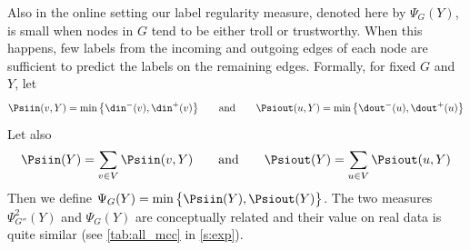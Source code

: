 Also in the online setting our label regularity measure, denoted here by $\Psi_G(Y)$, is small when
nodes in $G$ tend to be either troll or trustworthy. When this happens, few labels from the
incoming and outgoing edges of each node are sufficient to predict the labels on the remaining
edges. Formally, for fixed $G$ and $Y$, let 
$$
\Psiin(v,Y) = \min\big\{\din^-(v),\din^+(v)\big\}
\qquad\text{and}\qquad
\Psiout(u,Y) = \min\big\{\dout^-(u),\dout^+(u)\big\}
$$
Let also
$$
\Psiin(Y) = \sum_{v \in V} \Psiin(v,Y)
\qquad\text{and}\qquad
\Psiout(Y) = \sum_{u \in V} \Psiout(u,Y)
$$
Then we define $\Psi_G(Y) = \min\big\{\Psiin(Y),\Psiout(Y)\big\}$. The two measures
$\Psi^2_{G''}(Y)$ and $\Psi_G(Y)$ are conceptually related and their value on real data is quite
similar (see \autoref{tab:all_mcc} in \autoref{s:exp}).

